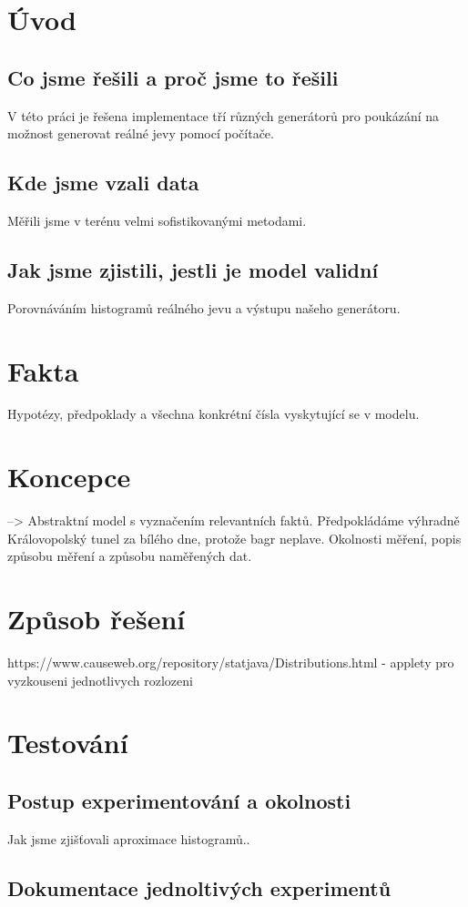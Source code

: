 \documentclass[11pt,a4paper]{article}
\begin{document}

\clearpage

\tableofcontents
\clearpage

\section{Úvod}
	\subsection{Co jsme řešili a proč jsme to řešili}
	V této práci je řešena implementace tří různých generátorů pro poukázání na možnost
	generovat reálné jevy pomocí počítače.
	\subsection{Kde jsme vzali data}
	Měřili jsme v terénu velmi sofistikovanými metodami.
	\subsection{Jak jsme zjistili, jestli je model validní}
	Porovnáváním histogramů reálného jevu a výstupu našeho generátoru.
\section{Fakta}
Hypotézy, předpoklady a všechna konkrétní čísla vyskytující se v modelu.
\section{Koncepce}
--> Abstraktní model s vyznačením relevantních faktů.
Předpokládáme výhradně Královopolský tunel za bílého dne, protože bagr neplave.
Okolnosti měření, popis způsobu měření a způsobu naměřených dat.
\section{Způsob řešení}
https://www.causeweb.org/repository/statjava/Distributions.html - applety pro vyzkouseni jednotlivych rozlozeni
\section{Testování}
	\subsection{Postup experimentování a okolnosti}
	Jak jsme zjišťovali aproximace histogramů..
	\subsection{Dokumentace jednoltivých experimentů}
\end{document}
